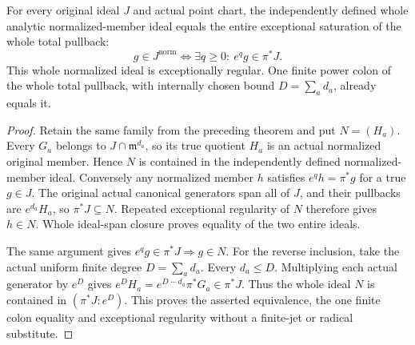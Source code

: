 \begin{theorem}
\label{hir:actual-original-point-normalized-total-saturation}
\leanok
For every original ideal $J$ and actual point chart, the independently
defined whole analytic normalized-member ideal equals the entire
exceptional saturation of the whole total pullback:
\[
 g\in J^{\mathrm{norm}}\iff
 \exists q\ge0:\ e^qg\in\pi^*J.
\]
This whole normalized ideal is exceptionally regular. One finite power
colon of the whole total pullback, with internally chosen bound
$D=\sum_a d_a$, already equals it.
\end{theorem}
\begin{proof}
Retain the same family from the preceding theorem and put $N=(H_a)$.
Every $G_a$ belongs to $J\cap\mathfrak m^{d_a}$, so its true quotient
$H_a$ is an actual normalized original member. Hence $N$ is contained
in the independently defined normalized-member ideal. Conversely any
normalized member $h$ satisfies $e^qh=\pi^*g$ for a true $g\in J$.
The original actual canonical generators span all of $J$, and their
pullbacks are $e^{d_a}H_a$, so $\pi^*J\subseteq N$. Repeated exceptional
regularity of $N$ therefore gives $h\in N$. Whole ideal-span closure
proves equality of the two entire ideals.

The same argument gives $e^qg\in\pi^*J\Rightarrow g\in N$.
For the reverse inclusion, take the actual uniform finite degree
$D=\sum_a d_a$. Every $d_a\le D$. Multiplying each actual generator
by $e^D$ gives
$e^DH_a=e^{D-d_a}\pi^*G_a\in\pi^*J$. Thus the whole ideal $N$ is
contained in $(\pi^*J:e^D)$. This proves the asserted equivalence,
the one finite colon equality and exceptional regularity without a
finite-jet or radical substitute.
\end{proof}

